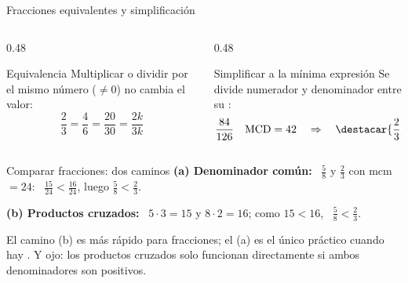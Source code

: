 \documentclass[aspectratio=169,10pt]{beamer}
\begin{document}
\begin{frame}{Fracciones equivalentes y simplificación}
  \scriptsize
  \begin{columns}[T,onlytextwidth]
    \begin{column}{0.48\textwidth}
      \begin{block}{Equivalencia}
        \tiny
        Multiplicar o dividir  por el mismo número
        ($\neq 0$) no cambia el valor:
        \[ \frac{2}{3} = \frac{4}{6} = \frac{20}{30} = \frac{2k}{3k} \]
      \end{block}
    \end{column}
    \begin{column}{0.48\textwidth}
      \begin{block}{Simplificar a la mínima expresión}
        \tiny
        Se divide numerador y denominador entre su :
        \[ \frac{84}{126} \quad \mathrm{MCD} = 42 \quad
           \Rightarrow \quad \destacar{\frac{2}{3}} \]
      \end{block}
    \end{column}
  \end{columns}

  \vspace{0.12cm}
  \begin{exampleblock}{Comparar fracciones: dos caminos}
    \scriptsize
    \textbf{(a) Denominador común:} \ $\tfrac{5}{8}$ y $\tfrac{2}{3}$ con
    mcm $=24$: \ $\tfrac{15}{24} < \tfrac{16}{24}$, luego
    $\tfrac{5}{8} < \tfrac{2}{3}$.

    \vspace{0.08cm}
    \textbf{(b) Productos cruzados:} \ $5\cdot 3 = 15$ y $8\cdot 2 = 16$;
    como $15 < 16$, \ $\tfrac{5}{8} < \tfrac{2}{3}$.
  \end{exampleblock}

  \vspace{0.05cm}
  {\tiny\color{uniGris} El camino (b) es más rápido para 
  fracciones; el (a) es el único práctico cuando hay . Y ojo:
  los productos cruzados solo funcionan directamente si ambos denominadores son
  positivos.}
\end{frame}
\end{document}
